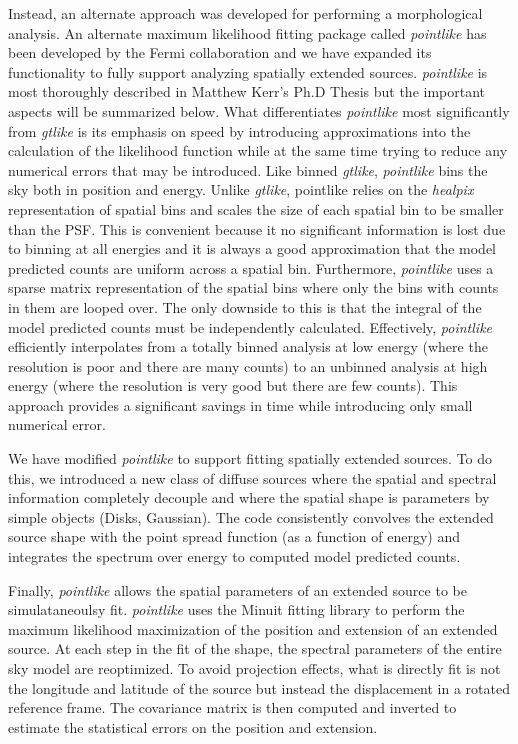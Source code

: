 \documentclass{emulateapj}
\begin{document}
Instead, an alternate approach was developed for performing
a morphological analysis. An alternate maximum likelihood fitting
package called {\em pointlike} has been developed by the Fermi
collaboration and we have expanded its functionality to fully support
analyzing spatially extended sources. {\em pointlike} is most thoroughly
described in Matthew Kerr's Ph.D Thesis\cite{Matthew_kerr_phd_thesis}
but the important aspects will be summarized below. What differentiates
{\em pointlike} most significantly from {\em gtlike} is its emphasis
on speed by introducing approximations into the calculation of the
likelihood function while at the same time trying to reduce any
numerical errors that may be introduced.  Like binned {\em gtlike},
{\em pointlike} bins the sky both in position and energy.  Unlike {\em
gtlike}, pointlike relies on the {\em healpix} representation of spatial
bins\cite{healpix_paper} and scales the size of each spatial bin to be
smaller than the PSF. This is convenient because it no
significant information is lost due to binning at all energies and it is
always a good approximation that the model predicted counts are uniform
across a spatial bin. Furthermore, {\em pointlike} uses a sparse matrix
representation of the spatial bins where only the bins with counts in them
are looped over. The only downside to this is that the integral of the
model predicted counts must be independently calculated.  Effectively,
{\em pointlike} efficiently interpolates from a totally binned analysis
at low energy (where the resolution is poor and there are many counts)
to an unbinned analysis at high energy (where the resolution is very
good but there are few counts). This approach provides a significant
savings in time while introducing only small numerical error.

We have modified {\em pointlike} to support fitting spatially extended
sources.  To do this, we introduced a new class of diffuse sources where
the spatial and spectral information completely decouple and where
the spatial shape is parameters by simple objects (Disks, Gaussian).
The code consistently convolves the extended source shape with the point
spread function (as a function of energy) and integrates the spectrum over energy
to computed model predicted counts.

Finally, {\em pointlike} allows the spatial parameters of an extended
source to be simulataneoulsy fit. {\em pointlike} uses the Minuit fitting
library to perform the maximum likelihood maximization of the position
and extension of an extended source\cite{Minuit reference}.  At each
step in the fit of the shape, the spectral parameters of the entire sky
model are reoptimized. To avoid projection effects, what is directly
fit is not the longitude and latitude of the source but instead
the displacement in a rotated reference frame. The covariance matrix is
then computed and inverted to estimate the statistical errors on the
position and extension.
\end{document}
